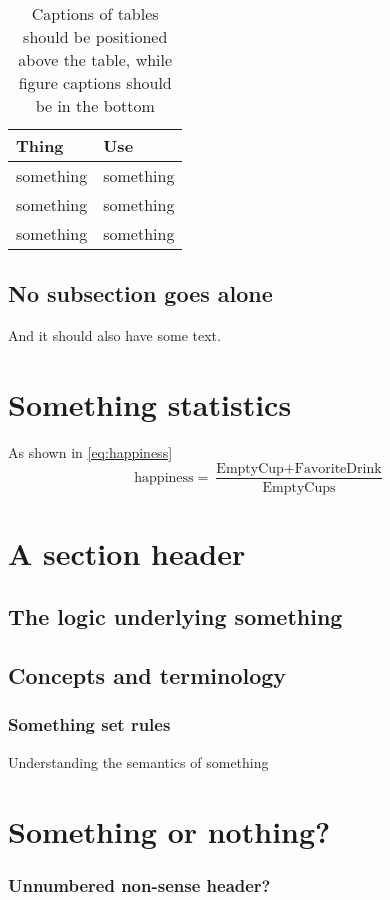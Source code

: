 		
\begin{table}[hb] %
	\centering
	\caption{Captions of tables should be positioned above the table, while figure captions should be in the bottom}
	\begin{tabular}{ll}
		\hline
		\textbf{Thing} & \textbf{Use} \\
		\hline
		something & something \\
		something & something \\
		something & something \\
		\hline
	\end{tabular}
	\label{tab:typesomething}
\end{table}
		
\subsection{No subsection goes alone}
\label{subsec:somenoth}

And it should also have some text.


\section{Something statistics}
\label{sec:somestatistics}
	
As shown in \autoref{eq:happiness}
\begin{equation}\label{eq:happiness}
	\mbox{happiness}=\frac{\mbox{EmptyCup}+\mbox{FavoriteDrink}}{\mbox{EmptyCups}}
\end{equation}	
	
\section{A section header}
\label{sec:some-ref}
	
\subsection{The logic underlying something}
\label{subsec:logicunderlying}
    	
    	
\subsection{Concepts and terminology}
\label{subsec:conceptsterm}	
		
\subsubsection*{Something set rules} 

Understanding the semantics of something

\section{Something or nothing?}
\label{sec:someornot}

\subsubsection*{Unnumbered non-sense header?}

   	
    	
    
